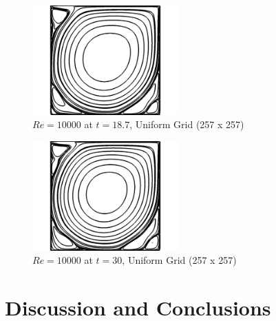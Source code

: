 \documentclass[twocolumn,10pt]{asme2ej}
\begin{document}
\begin{figure}[htb]
\begin{center}
\includegraphics[width=0.5\textwidth]{figure/Re10000.png}
\caption{$Re = 10000$ at $t = 18.7$, Uniform Grid (257 x 257)}
\end{center}
\end{figure}

\begin{figure}[htb]
\begin{center}
\includegraphics[width=0.5\textwidth]{figure/Re10000-fin.png}
\caption{$Re = 10000$ at $t = 30$, Uniform Grid (257 x 257)}
\end{center}
\end{figure}

\section{Discussion and Conclusions}

\nocite{*}
\hfill \break


\end{document}
